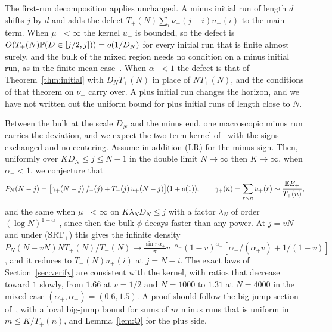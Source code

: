 \begin{remark}\label{rem:dom-initial}
The first-run decomposition applies unchanged. A minus initial run of length $d$ shifts $j$
by $d$ and adds the defect $T_\plus(N)\sum_i\nu_\minus(j-i)u_\minus(i)$ to the main term. When
$\mu_\minus<\infty$ the kernel $u_\minus$ is bounded, so the defect is
$O(T_{+}(N)\mathbb{P}(D\in[j/2,j]))=o(1/D_N)$ for every initial run that is finite almost surely, and
the bulk of the mixed region needs no condition on a minus initial run, as in the finite-mean
case~\cite{paperF}. When $\alpha_\minus<1$ the defect is that of Theorem~\ref{thm:initial} with
$D_NT_\plus(N)$ in place of $NT_\plus(N)$, and the conditions of that theorem on $\nu_\minus$ carry
over. A plus initial run changes the horizon, and we have not written out the uniform bound
for plus initial runs of length close to $N$.
\end{remark}

\ifarxivbuild
\begin{remark}\label{rem:claimK}
Between the bulk at the scale $D_N$ and the minus end, one macroscopic minus run carries the
deviation, and we expect the two-term kernel of~\cite[Theorem~B]{paperF} with the signs
exchanged and no centering. Assume in addition (LR) for the minus sign. Then, uniformly over
$KD_N\le j\le N-1$ in the double limit $N\to\infty$ then $K\to\infty$, when $\alpha_\minus<1$, we
conjecture that
\[
 P_N(N-j)=\bigl[\gamma_{+}(N-j)\,f_{-}(j)+T_{-}(j)\,u_{+}(N-j)\bigr](1+o(1)),\qquad
 \gamma_{+}(n)=\sum_{r<n}u_{+}(r)\sim\frac{\mathbb{E} E_{+}}{T_{+}(n)},
\]
and the same when $\mu_\minus<\infty$ on $K\lambda_ND_N\le j$ with a factor $\lambda_N$ of order
$(\log N)^{1-\alpha_\plus}$, since then the bulk $\phi$ decays faster than any power. At $j=vN$
and under (SRT$_\plus$) this gives the infinite density
$P_N(N-vN)NT_\plus(N)/T_\minus(N)\to\frac{\sin\pi\alpha_\plus}\pi v^{-\alpha_\minus}(1-v)^{\alpha_\plus}[\alpha_\minus/(\alpha_\plus v)+1/(1-v)]$,
and it reduces to $T_\minus(N)u_\plus(i)$ at $j=N-i$. The exact laws of Section~\ref{sec:verify}
are consistent with the kernel, with ratios that decrease toward $1$ slowly, from $1.66$ at
$v=1/2$ and $N=1000$ to $1.31$ at $N=4000$ in the mixed case $(\alpha_\plus,\alpha_\minus)=(0.6,1.5)$.
A proof should follow the big-jump section of~\cite{paperF}, with a local big-jump bound for
sums of $m$ minus runs that is uniform in $m\le K/T_\plus(n)$, and Lemma~\ref{lem:Q} for the plus
side.
\end{remark}
\fi
